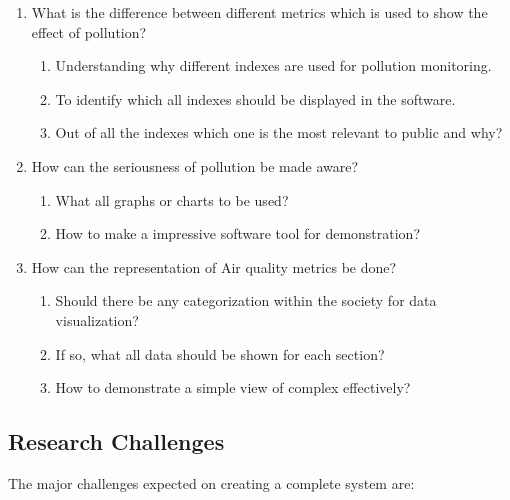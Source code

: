 \documentclass[11pt]{article}
\begin{document}
\begin{enumerate}
 
   \item What is the difference between different metrics which is used to show       	the effect of pollution?
   \begin{enumerate}
   \item Understanding why different indexes are used for pollution monitoring.
   \item To identify which all indexes should be displayed in the software.
   \item Out of all the indexes which one is the most relevant to public and why?
  
   \end{enumerate}
  
 \item How can the seriousness of pollution be made aware?
 \begin{enumerate}
 \item What all graphs or charts to be used?
 \item How to make a impressive software tool for demonstration?
 \end{enumerate}
 
 \item How can the representation of Air quality metrics be done?
\begin{enumerate}
\item Should there be any categorization within the society for data visualization?
\item If so, what all data should be shown for each section?
\item How to demonstrate a simple view of complex effectively?
\end{enumerate}
 
 

 
 \end{enumerate}
 
\subsection{Research Challenges}


The major challenges expected on creating a complete system are:
\end{document}
